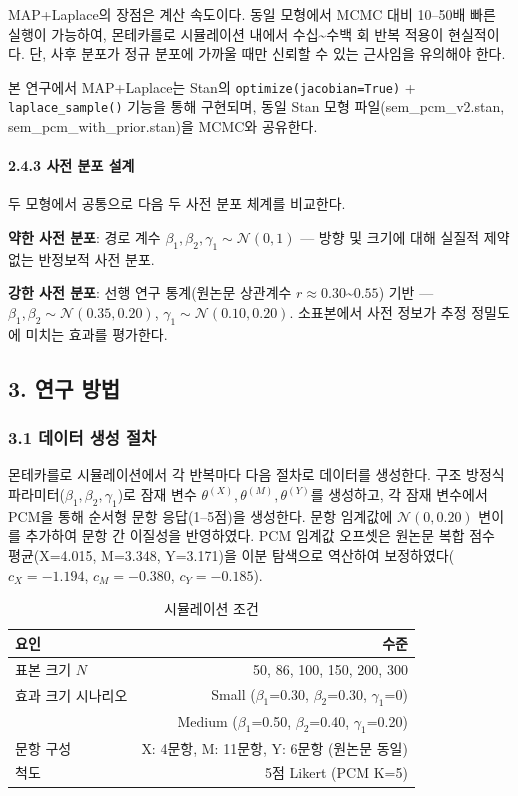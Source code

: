 \documentclass[a4paper,10pt]{oblivoir}
\begin{document}
MAP+Laplace의 장점은 계산 속도이다. 동일 모형에서 MCMC 대비 10--50배 빠른 실행이 가능하여, 몬테카를로 시뮬레이션 내에서 수십\~{}수백 회 반복 적용이 현실적이다. 단, 사후 분포가 정규 분포에 가까울 때만 신뢰할 수 있는 근사임을 유의해야 한다.

본 연구에서 MAP+Laplace는 Stan의 \texttt{optimize(jacobian=True)} + \texttt{laplace\_sample()} 기능을 통해 구현되며, 동일 Stan 모형 파일(sem\_pcm\_v2.stan, sem\_pcm\_with\_prior.stan)을 MCMC와 공유한다.

\paragraph{2.4.3 사전 분포 설계}

두 모형에서 공통으로 다음 두 사전 분포 체계를 비교한다.

\textbf{약한 사전 분포}: 경로 계수 $\beta_1, \beta_2, \gamma_1 \sim \mathcal{N}(0, 1)$ — 방향 및 크기에 대해 실질적 제약 없는 반정보적 사전 분포.

\textbf{강한 사전 분포}: 선행 연구 통계(원논문 상관계수 $r \approx 0.30$\~{}$0.55$) 기반 — $\beta_1, \beta_2 \sim \mathcal{N}(0.35, 0.20)$, $\gamma_1 \sim \mathcal{N}(0.10, 0.20)$. 소표본에서 사전 정보가 추정 정밀도에 미치는 효과를 평가한다.


\subsection{3. 연구 방법}

\subsubsection{3.1 데이터 생성 절차}

몬테카를로 시뮬레이션에서 각 반복마다 다음 절차로 데이터를 생성한다. 구조 방정식 파라미터($\beta_1, \beta_2, \gamma_1$)로 잠재 변수 $\theta^{(X)}, \theta^{(M)}, \theta^{(Y)}$를 생성하고, 각 잠재 변수에서 PCM을 통해 순서형 문항 응답(1--5점)을 생성한다. 문항 임계값에 $\mathcal{N}(0, 0.20)$ 변이를 추가하여 문항 간 이질성을 반영하였다. PCM 임계값 오프셋은 원논문 복합 점수 평균(X=4.015, M=3.348, Y=3.171)을 이분 탐색으로 역산하여 보정하였다($c_X=-1.194$, $c_M=-0.380$, $c_Y=-0.185$).

\begin{table}[htbp]
\centering
\caption{시뮬레이션 조건}
\small
\begin{tabular}{lr}
\toprule
요인 & 수준 \\
\midrule
표본 크기 $N$ & 50, 86, 100, 150, 200, 300 \\
효과 크기 시나리오 & Small ($\beta_1$=0.30, $\beta_2$=0.30, $\gamma_1$=0) \\
 & Medium ($\beta_1$=0.50, $\beta_2$=0.40, $\gamma_1$=0.20) \\
문항 구성 & X: 4문항, M: 11문항, Y: 6문항 (원논문 동일) \\
척도 & 5점 Likert (PCM K=5) \\
\bottomrule
\end{tabular}
\end{table}
\end{document}
